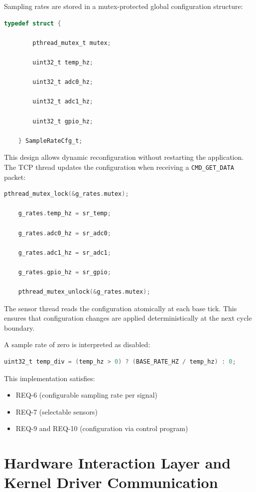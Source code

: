 Sampling rates are stored in a mutex-protected global configuration structure:

\begin{lstlisting}[language=C]
	typedef struct {
		
		pthread_mutex_t mutex;
		
		uint32_t temp_hz;
		
		uint32_t adc0_hz;
		
		uint32_t adc1_hz;
		
		uint32_t gpio_hz;
		
	} SampleRateCfg_t;
\end{lstlisting}

This design allows dynamic reconfiguration without restarting the application. The TCP thread updates the configuration when receiving a \texttt{CMD\_GET\_DATA} packet:

\begin{lstlisting}[language=C]
	pthread_mutex_lock(&g_rates.mutex);
	
	g_rates.temp_hz = sr_temp;
	
	g_rates.adc0_hz = sr_adc0;
	
	g_rates.adc1_hz = sr_adc1;
	
	g_rates.gpio_hz = sr_gpio;
	
	pthread_mutex_unlock(&g_rates.mutex);
\end{lstlisting}

The sensor thread reads the configuration atomically at each base tick. This ensures that configuration changes are applied deterministically at the next cycle boundary.

A sample rate of zero is interpreted as disabled:

\begin{lstlisting}[language=C]
	uint32_t temp_div = (temp_hz > 0) ? (BASE_RATE_HZ / temp_hz) : 0;
\end{lstlisting}

This implementation satisfies:

\begin{itemize}
	\item REQ-6 (configurable sampling rate per signal)
	\item REQ-7 (selectable sensors)
	\item REQ-9 and REQ-10 (configuration via control program)
\end{itemize}

\section{Hardware Interaction Layer and Kernel Driver Communication}

